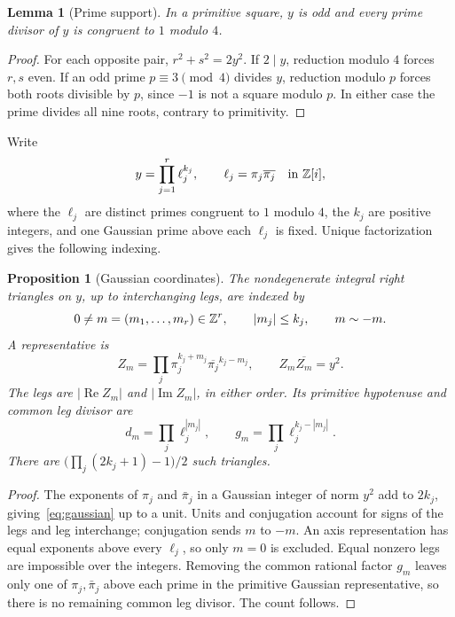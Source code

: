 \documentclass[11pt,letterpaper]{article}
\newtheorem{proposition}[theorem]{Proposition}
\newtheorem{lemma}[theorem]{Lemma}
\theoremstyle{definition}\newtheorem{definition}[theorem]{Definition}
\theoremstyle{remark}\newtheorem{remark}[theorem]{Remark}
\begin{document}
\begin{lemma}[Prime support]\label{lem:support}
In a primitive square, $y$ is odd and every prime divisor of $y$ is congruent to $1$ modulo $4$.
\end{lemma}
\begin{proof}
For each opposite pair, $r^2+s^2=2y^2$. If $2\mid y$, reduction modulo $4$ forces $r,s$ even. If an odd prime $p\equiv3\pmod4$ divides $y$, reduction modulo $p$ forces both roots divisible by $p$, since $-1$ is not a square modulo $p$. In either case the prime divides all nine roots, contrary to primitivity.
\end{proof}

Write
\[
 y=\prod_{j=1}^r\ell_j^{k_j},\qquad
 \ell_j=\pi_j\overline{\pi_j}\quad\text{in }\mathbb Z[i],
\]
where the $\ell_j$ are distinct primes congruent to $1$ modulo $4$, the $k_j$ are positive integers, and one Gaussian prime above each $\ell_j$ is fixed. Unique factorization gives the following indexing.
\begin{proposition}[Gaussian coordinates]\label{prop:gaussian}
The nondegenerate integral right triangles on $y$, up to interchanging legs, are indexed by
\[
 0\ne m=(m_1,\ldots,m_r)\in\mathbb Z^r,\qquad |m_j|\le k_j,
 \qquad m\sim-m.
\]
A representative is
\begin{equation}\label{eq:gaussian}
 Z_m=\prod_j\pi_j^{k_j+m_j}\overline{\pi_j}^{k_j-m_j},
 \qquad Z_m\overline{Z_m}=y^2.
\end{equation}
The legs are $|\operatorname{Re}Z_m|$ and $|\operatorname{Im}Z_m|$, in either order. Its primitive hypotenuse and common leg divisor are
\[
 d_m=\prod_j\ell_j^{|m_j|},\qquad
 g_m=\prod_j\ell_j^{k_j-|m_j|}.
\]
There are $\bigl(\prod_j(2k_j+1)-1\bigr)/2$ such triangles.
\end{proposition}
\begin{proof}
The exponents of $\pi_j$ and $\bar\pi_j$ in a Gaussian integer of norm $y^2$ add to $2k_j$, giving~\eqref{eq:gaussian} up to a unit. Units and conjugation account for signs of the legs and leg interchange; conjugation sends $m$ to $-m$. An axis representation has equal exponents above every $\ell_j$, so only $m=0$ is excluded. Equal nonzero legs are impossible over the integers. Removing the common rational factor $g_m$ leaves only one of $\pi_j,\bar\pi_j$ above each prime in the primitive Gaussian representative, so there is no remaining common leg divisor. The count follows.
\end{proof}
\end{document}
